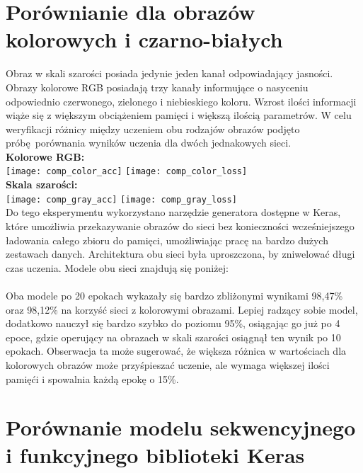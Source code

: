 \section{Porównianie dla obrazów kolorowych i czarno-białych}
Obraz w skali szarości posiada jedynie jeden kanał odpowiadający jasności. Obrazy kolorowe RGB
posiadają trzy kanały informujące o nasyceniu odpowiednio czerwonego, zielonego i niebieskiego koloru.
Wzrost ilości informacji wiąże się z większym obciążeniem pamięci i większą ilością parametrów.
W celu weryfikacji różnicy między uczeniem obu rodzajów obrazów podjęto próbę porównania wyników
uczenia dla dwóch jednakowych sieci.\\
\textbf{Kolorowe RGB:}\\
\texttt{[image: comp\_color\_acc]}
\texttt{[image: comp\_color\_loss]}\\
\textbf{Skala szarości:}\\
\texttt{[image: comp\_gray\_acc]}
\texttt{[image: comp\_gray\_loss]}\\
Do tego eksperymentu wykorzystano narzędzie generatora dostępne w Keras, które umożliwia
przekazywanie obrazów do sieci bez konieczności wcześniejszego ładowania całego zbioru
do pamięci, umożliwiając pracę na bardzo dużych zestawach danych. Architektura obu
sieci była uproszczona, by zniwelować długi czas uczenia. Modele obu sieci znajdują się poniżej:\\\\
Oba modele po 20 epokach wykazały się bardzo zbliżonymi wynikami 98,47\% oraz 98,12\%
na korzyść sieci z kolorowymi obrazami. Lepiej radzący sobie model, dodatkowo nauczył
się bardzo szybko do poziomu 95\%, osiągając go już po 4 epoce, gdzie operujący na
obrazach w skali szarości osiągnął ten wynik po 10 epokach. Obserwacja ta może sugerować,
że większa różnica w wartościach dla kolorowych obrazów może przyśpieszać uczenie, ale
wymaga większej ilości pamięći i spowalnia każdą epokę o 15\%.

\section{Porównanie modelu sekwencyjnego i funkcyjnego biblioteki Keras}
